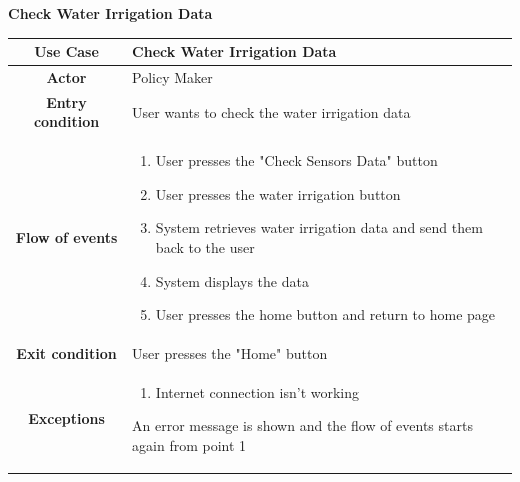 \documentclass[table, 12pt]{article}
\begin{document}
\begin{itemize}
            \begin{table}[H]
                \item[] \textbf{Check Water Irrigation Data}
                \item[] 
                \centering
                \begin{tabular}{|c| m{}|}
                    \hline
                    \textbf{Use Case} & Check Water Irrigation Data\\ \hline
                    \textbf{Actor} & Policy Maker \\ \hline
                    \textbf{Entry condition} & User wants to check the water irrigation data\\  \hline
                    \textbf{Flow of events} & \begin{enumerate}
                                                \item User presses the "Check Sensors Data" button
                                                \item User presses the water irrigation button
                                                \item System retrieves water irrigation data and send them back to the user 
                                                \item System displays the data
                                                \item User presses the home button and return to home page
                                            \end{enumerate}\\ \hline
                    \textbf{Exit condition} & User presses the "Home" button\\ \hline
                    \textbf{Exceptions} & \begin{enumerate}
                        \item Internet connection isn't working
                    \end{enumerate}
                    An error message is shown and the flow of events starts again from point 1\\ \hline                   
                \end{tabular}
            \end{table}


\end{itemize}
\end{document}
